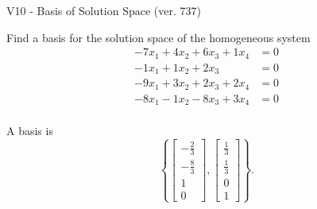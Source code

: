 \begin{exercise}
  \begin{exerciseTitle}V10 - Basis of Solution Space (ver. 737)\end{exerciseTitle}
  \begin{exerciseStatement}
    Find a basis for the solution space of the homogeneous system 
\begin{align*}
 -7 x_ 1 + 4 x_ 2 + 6 x_ 3 + 1 x_ 4 &= 0  \\ 
  -1 x_ 1 + 1 x_ 2 + 2 x_ 3 &= 0  \\ 
  -9 x_ 1 + 3 x_ 2 + 2 x_ 3 + 2 x_ 4 &= 0  \\ 
  -8 x_ 1 -1 x_ 2 -8 x_ 3 + 3 x_ 4 &= 0  \\ 
 \end{align*}


 
  \end{exerciseStatement}

  \begin{exerciseAnswer}
   A basis is   
\[\left\{\left[\begin{array}{c}
-\frac{2}{3} \\
-\frac{8}{3} \\
1 \\
0
\end{array}\right] , \left[\begin{array}{c}
\frac{1}{3} \\
\frac{1}{3} \\
0 \\
1
\end{array}\right]\right\}.\]

  


  \end{exerciseAnswer}
\end{exercise}